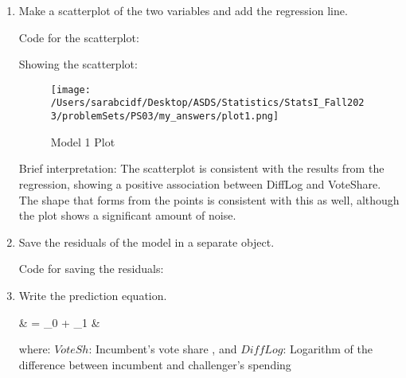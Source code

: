 \documentclass[12pt,letterpaper]{article}
\begin{document}
\begin{enumerate}
		\item Make a scatterplot of the two variables and add the regression line. 	\vspace{0.25cm}
		
		Code for the scatterplot: 
		
		
		Showing the scatterplot: 
		\begin{figure}[H]
			\centering
			\texttt{[image: /Users/sarabcidf/Desktop/ASDS/Statistics/StatsI\_Fall2023/problemSets/PS03/my\_answers/plot1.png]}
			\caption{Model 1 Plot}
		\end{figure}
		
		Brief interpretation: 
		The scatterplot is consistent with the results from the regression, showing a positive association between DiffLog and VoteShare. The shape that forms from the points is consistent with this as well, although the plot shows a significant amount of noise. 
		
		\item Save the residuals of the model in a separate object.	
		
		Code for saving the residuals: 
		
		
		\item Write the prediction equation.
		
		{\setlength{\abovedisplayskip}{2pt} 
			\setlength{\belowdisplayskip}{6pt} 
		
		\begin{flalign*}
			& = \beta_0 + \beta_1 \cdot {}  &
		\end{flalign*}
		
			where:  $VoteSh$: Incumbent's vote share , and $DiffLog$: Logarithm of the difference between incumbent and challenger's spending
	   }
		
 		\end{enumerate}
	
\newpage
\end{document}
